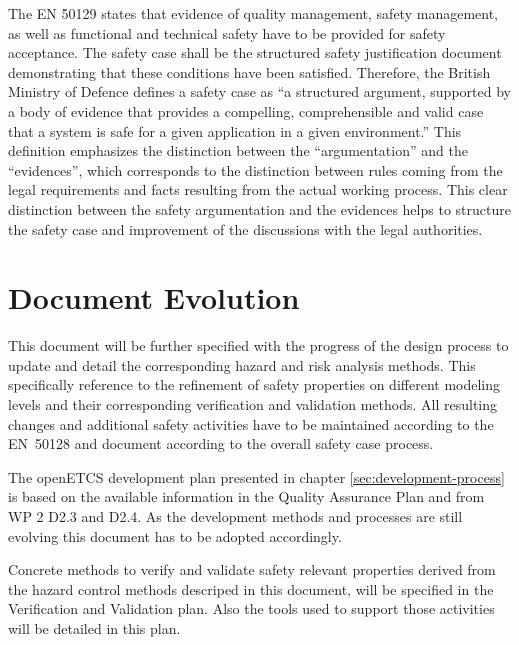 \documentclass{template/openetcs_report}
\begin{document}
The EN 50129 states that evidence of quality management, safety management, as well as functional and technical safety have to be provided for safety acceptance. The safety case shall be the structured safety justification document demonstrating that these conditions have been satisfied.
Therefore, the British Ministry of Defence defines a safety case as “a structured argument, supported by a body of evidence that provides a compelling, comprehensible and valid case that a system is safe for a given application in a given environment.”\cite{MinistryofDefence.2007} This definition emphasizes the distinction between the “argumentation” and the “evidences”, which corresponds to the distinction between rules coming from the legal requirements and facts resulting from the actual working process. This clear distinction between the safety argumentation and the evidences helps to structure the safety case and improvement of the discussions with the legal authorities.\cite{Muller.2010}



\chapter{Document Evolution}

This document will be further specified with the progress of the design process to update and detail the corresponding hazard and risk analysis methods. This specifically reference to the refinement of safety properties on different modeling levels and their corresponding verification and validation methods. All resulting changes and additional safety activities have to be maintained according to the EN~50128 and document according to the overall safety case process. 

The openETCS development plan presented in chapter \ref{sec:development-process} is based on the available information in the Quality Assurance Plan and from WP 2 D2.3 and D2.4. As the development methods and processes are still evolving this document has to be adopted accordingly.

Concrete methods to verify and validate safety relevant properties derived from the hazard control methods descriped in this document, will be specified in the Verification and Validation plan. Also the tools used to support those activities will be detailed in this plan.
\end{document}
